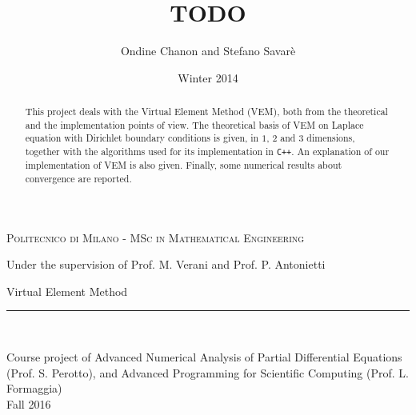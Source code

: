 \documentclass[letter,11pt]{article}
\title{TODO} %
\author{Ondine Chanon and Stefano Savarè} %
\date{Winter 2014}
\begin{document}
\begin{titlepage}


\begin{center}
\textsc{Politecnico di Milano - MSc in Mathematical Engineering}

Under the supervision of Prof. M. Verani and Prof. P. Antonietti
\end{center}

\vfill


\begin{center}
\begin{Huge}
Virtual Element Method\\ 
\vspace{3mm}
\end{Huge}
\end{center}

\noindent\rule{\linewidth}{2pt}

\vspace{5mm}


~\vspace{1cm}


\vfill

\begin{center}
Course project of Advanced Numerical Analysis
of Partial Differential Equations (Prof. S. Perotto), and Advanced Programming for Scientific Computing (Prof. L. Formaggia)\\
\vspace{1cm}
Fall 2016
\end{center}

\end{titlepage}

~\vfill
\thispagestyle{empty}
\begin{abstract}
This project deals with the Virtual Element Method (VEM), both from the theoretical and the implementation points of view. The theoretical basis of VEM on Laplace equation with Dirichlet boundary conditions is given, in $1$, $2$ and $3$ dimensions, together with the algorithms used for its implementation in \verb!C++!. An explanation of our implementation of VEM is also given. Finally, some numerical results about convergence are reported.
\end{abstract}
\end{document}
